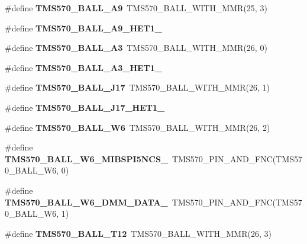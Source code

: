 \begin{DoxyCompactItemize}
\#define {\bfseries T\+M\+S570\+\_\+\+B\+A\+L\+L\+\_\+\+A9}~T\+M\+S570\+\_\+\+B\+A\+L\+L\+\_\+\+W\+I\+T\+H\+\_\+\+M\+MR(25, 3)
\item 
\#define {\bfseries T\+M\+S570\+\_\+\+B\+A\+L\+L\+\_\+\+A9\+\_\+\+H\+E\+T1\+\_}
\item 
\mbox{\label{tms570ls3137zwt-pins_8h_a0f86441a7c32b96e40c5a296c56287d8}} 
\#define {\bfseries T\+M\+S570\+\_\+\+B\+A\+L\+L\+\_\+\+A3}~T\+M\+S570\+\_\+\+B\+A\+L\+L\+\_\+\+W\+I\+T\+H\+\_\+\+M\+MR(26, 0)
\item 
\#define {\bfseries T\+M\+S570\+\_\+\+B\+A\+L\+L\+\_\+\+A3\+\_\+\+H\+E\+T1\+\_}
\item 
\mbox{\label{tms570ls3137zwt-pins_8h_ab24eed064669c10a110465621f1d9216}} 
\#define {\bfseries T\+M\+S570\+\_\+\+B\+A\+L\+L\+\_\+\+J17}~T\+M\+S570\+\_\+\+B\+A\+L\+L\+\_\+\+W\+I\+T\+H\+\_\+\+M\+MR(26, 1)
\item 
\#define {\bfseries T\+M\+S570\+\_\+\+B\+A\+L\+L\+\_\+\+J17\+\_\+\+H\+E\+T1\+\_}
\item 
\mbox{\label{tms570ls3137zwt-pins_8h_aae7d583a318c1ffed1919ee32b3ead32}} 
\#define {\bfseries T\+M\+S570\+\_\+\+B\+A\+L\+L\+\_\+\+W6}~T\+M\+S570\+\_\+\+B\+A\+L\+L\+\_\+\+W\+I\+T\+H\+\_\+\+M\+MR(26, 2)
\item 
\mbox{\label{tms570ls3137zwt-pins_8h_ab984c59a723527d69528c60c32ef8de6}} 
\#define {\bfseries T\+M\+S570\+\_\+\+B\+A\+L\+L\+\_\+\+W6\+\_\+\+M\+I\+B\+S\+P\+I5\+N\+C\+S\+\_}~T\+M\+S570\+\_\+\+P\+I\+N\+\_\+\+A\+N\+D\+\_\+\+F\+NC(T\+M\+S570\+\_\+\+B\+A\+L\+L\+\_\+\+W6, 0)
\item 
\mbox{\label{tms570ls3137zwt-pins_8h_a0328857a1242815b6af1f0a68a2dddfc}} 
\#define {\bfseries T\+M\+S570\+\_\+\+B\+A\+L\+L\+\_\+\+W6\+\_\+\+D\+M\+M\+\_\+\+D\+A\+T\+A\+\_}~T\+M\+S570\+\_\+\+P\+I\+N\+\_\+\+A\+N\+D\+\_\+\+F\+NC(T\+M\+S570\+\_\+\+B\+A\+L\+L\+\_\+\+W6, 1)
\item 
\mbox{\label{tms570ls3137zwt-pins_8h_ac6a1a27419e52a7e6a99f9793cbd1cbd}} 
\#define {\bfseries T\+M\+S570\+\_\+\+B\+A\+L\+L\+\_\+\+T12}~T\+M\+S570\+\_\+\+B\+A\+L\+L\+\_\+\+W\+I\+T\+H\+\_\+\+M\+MR(26, 3)
\item 

\end{DoxyCompactItemize}

